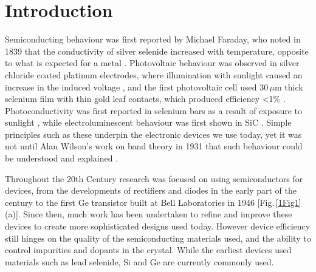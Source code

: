 
\chapter{Introduction}

\graphicspath{{Chapter1/Figures/}}

Semiconducting behaviour was first reported by Michael Faraday, who noted in 1839 that the conductivity of silver selenide increased with temperature, opposite to what is expected for a metal \cite{Faraday2012}. Photovoltaic behaviour was observed in silver chloride coated platinum electrodes, where illumination with sunlight caused an increase in the induced voltage \cite{Becquerel1839}, and the first photovoltaic cell used 30\,$\mu$m thick selenium film with thin gold leaf contacts, which produced efficiency <1\% \cite{Fritts1883}. Photoconductivity was first reported in selenium bars as a result of exposure to sunlight \cite{Smith1873, Adams1876}, while electroluminescent behaviour was first shown in SiC \cite{Round1907}. Simple principles such as these underpin the electronic devices we use today, yet it was not until Alan Wilson's work on band theory in 1931 that such behaviour could be understood and explained \cite{Wilson1931}. 

Throughout the 20th Century research was focused on using semiconductors for devices, from the developments of rectifiers and diodes in the early part of the century to the first Ge transistor built at Bell Laboratories in 1946 [Fig.\,\ref{1Fig1}(a)]. Since then, much work has been undertaken to refine and improve these devices to create more sophisticated designs used today. However device efficiency still hinges on the quality of the semiconducting materials used, and the ability to control impurities and dopants in the crystal. While the earliest devices used materials such as lead selenide, Si and Ge are currently commonly used.

